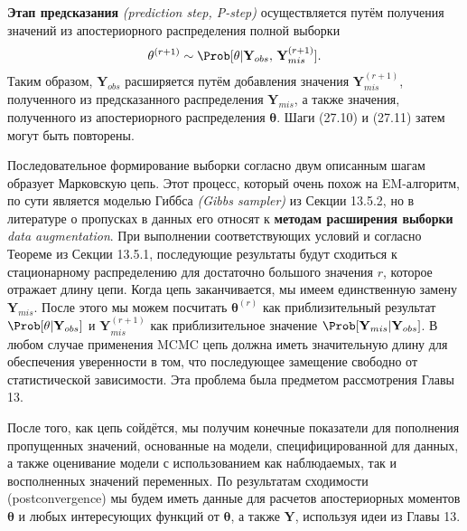 {\bf Этап предсказания} \emph{(prediction step, P-step)} осуществляется путём получения значений из апостериорного распределения полной выборки
\begin{equation}
\mathbf{\theta}^{(r+1)} \sim \Prob[\mathbf{\theta}|\mathbf{Y}_{obs}, \, \mathbf{Y}_{mis}^{(r+1)}].
\end{equation}
Таким образом, $\mathbf{Y}_{obs}$ расширяется путём добавления значения $\mathbf{Y}_{mis}^{(r+1)}$, полученного из предсказанного распределения $\mathbf{Y}_{mis}$, а также значения, полученного из апостериорного распределения $\mathbf{\theta}$. Шаги (27.10) и (27.11) затем могут быть повторены.

Последовательное формирование выборки согласно двум описанным шагам образует Марковскую цепь. Этот процесс, который очень похож на EM-алгоритм, по сути является моделью Гиббса \emph{(Gibbs sampler)} из Секции 13.5.2, но в литературе о пропусках в данных его относят к {\bf методам расширения выборки} \emph{data augmentation}. При выполнении соответствующих условий и согласно Теореме из Секции 13.5.1, последующие результаты будут сходиться к стационарному распределению для достаточно большого значения $r$, которое отражает длину цепи. Когда цепь заканчивается, мы имеем единственную замену $\mathbf{Y}_{mis}$. После этого мы можем посчитать $\mathbf{\theta}^{(r)}$ как приблизительный результат $\Prob[\mathbf{\theta}|\mathbf{Y}_{obs}]$ и $\mathbf{Y}_{mis}^{(r+1)}$ как приблизительное значение $\Prob[\mathbf{Y}_{mis}|\mathbf{Y}_{obs}]$. В любом случае применения MCMC цепь должна иметь значительную длину для обеспечения уверенности в том, что последующее замещение свободно от статистической зависимости. Эта проблема была предметом рассмотрения Главы 13.

После того, как цепь сойдётся, мы получим конечные показатели для пополнения пропущенных значений, основанные на модели, специфицированной для данных, а также оценивание модели с использованием как наблюдаемых, так и восполненных значений переменных. По результатам сходимости (postconvergence) мы будем иметь данные для расчетов апостериорных моментов $\mathbf{\theta}$ и любых интересующих функций от $\mathbf{\theta}$, а также $\mathbf{Y}$, используя идеи из Главы 13.


